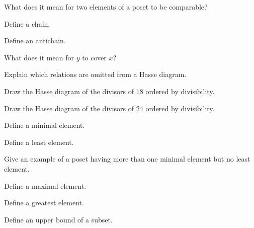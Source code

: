 \begin{exercise}[1]
What does it mean for two elements of a poset to be comparable?
\end{exercise}

\begin{exercise}[1]
Define a chain.
\end{exercise}

\begin{exercise}[1]
Define an antichain.
\end{exercise}

\begin{exercise}[1]
What does it mean for \(y\) to cover \(x\)?
\end{exercise}

\begin{exercise}[1]
Explain which relations are omitted from a Hasse diagram.
\end{exercise}

\begin{exercise}[2]
Draw the Hasse diagram of the divisors of \(18\) ordered by divisibility.
\end{exercise}

\begin{exercise}[2]
Draw the Hasse diagram of the divisors of \(24\) ordered by divisibility.
\end{exercise}

\begin{exercise}[1]
Define a minimal element.
\end{exercise}

\begin{exercise}[1]
Define a least element.
\end{exercise}

\begin{exercise}[2]
Give an example of a poset having more than one minimal element but no least
element.
\end{exercise}

\begin{exercise}[1]
Define a maximal element.
\end{exercise}

\begin{exercise}[1]
Define a greatest element.
\end{exercise}

\begin{exercise}[1]
Define an upper bound of a subset.
\end{exercise}

